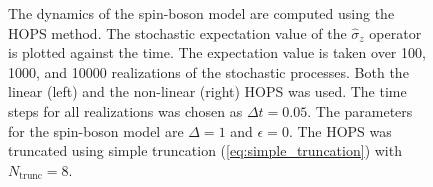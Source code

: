 \begin{figure}[!ht]
\begin{subfigure}[b]{0.471\textwidth}
    \end{subfigure}
    \caption{The dynamics of the spin-boson model are computed using the HOPS method. The stochastic expectation value of the $\hat{\sigma}_z$ operator is
    plotted against the time. The expectation value is taken over 100, 1000, and 10000 realizations of the stochastic processes. Both the linear (left) and the non-linear (right)
    HOPS was used. The time steps for all realizations was chosen as $\Delta t = 0.05$. The parameters for the spin-boson model are $\Delta = 1$ and $\epsilon = 0$. The  HOPS was truncated using simple truncation (\ref{eq:simple_truncation}) with $N_\text{trunc} = 8$.}
    \label{fig:full_runs_HOPS} 
\end{figure}